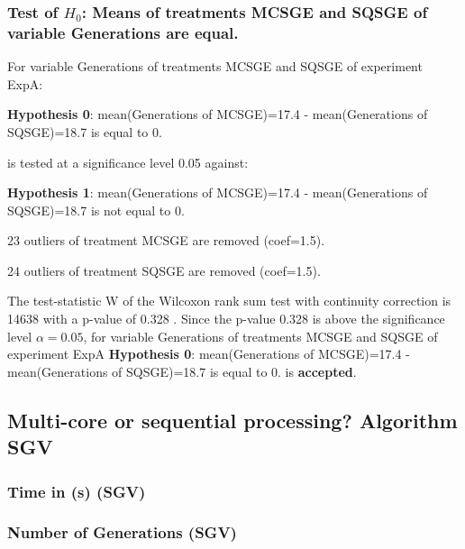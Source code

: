 \documentclass[18pt,c]{beamer}
\makeatletter
\let\beamer@writeslidentry@miniframeson=\beamer@writeslidentry
\newcommand*{\miniframeson}{\let\beamer@writeslidentry=\beamer@writeslidentry@miniframeson}
\makeatother
\begin{document}
\begin{frame}[t]
 \frametitle{Test of $H_{0}$: Means of treatments MCSGE and SQSGE of variable Generations are equal. }
 \scriptsize
 For variable Generations of treatments MCSGE and SQSGE of experiment ExpA:

\vspace{1mm}
{\bf Hypothesis 0}: mean(Generations of MCSGE)=17.4 - mean(Generations of SQSGE)=18.7 is equal to 0.


 \begin{center} is tested at a significance level 0.05 against: \end{center}

{\bf Hypothesis 1}: mean(Generations of MCSGE)=17.4 - mean(Generations of SQSGE)=18.7 is not equal to 0.
\vspace{1mm}
\vspace{1mm}

 23 outliers of treatment MCSGE are removed (coef=1.5).

 24 outliers of treatment SQSGE are removed (coef=1.5).
\vspace{1mm}
 
 The test-statistic W of the Wilcoxon rank sum test with continuity correction is 14638 with a p-value of 0.328 .
 Since the p-value 0.328 is above the significance level $\alpha= 0.05 $,
 for variable Generations of treatments MCSGE and SQSGE of experiment ExpA 
 {\bf Hypothesis 0}: mean(Generations of MCSGE)=17.4 - mean(Generations of SQSGE)=18.7 is equal to 0.
is {\bf accepted}.

 \end{frame}
\miniframeson
\subsection{Multi-core or sequential processing? Algorithm SGV}
 \begin{frame}
 \fontsize{8pt}{9pt}\selectfont
 \frametitle{ Time in (s) (SGV) }

 \label{ExpAStatsTable007.tex}  
 \end{frame}

 \begin{frame}
 \fontsize{8pt}{9pt}\selectfont
 \frametitle{ Number of Generations (SGV) }

 \label{ExpAStatsTable008.tex}  
 \end{frame}
\end{document}

